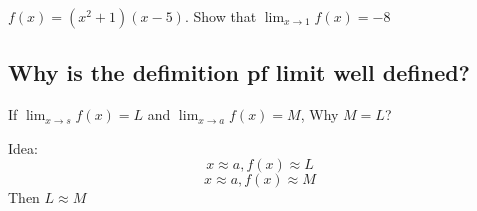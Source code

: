 \documentclass{report}
\begin{document}
     {
      $f(x) = (x^2+1)(x-5)$.  Show that $\lim_{x \to 1} f(x) = -8$
    }

    \subsection{Why is the defimition pf limit well defined?}%
    If $\lim_{x \to s} f(x) = L$ and $\lim_{x \to a} f(x) = M$, Why
    $M=L$?
      
    Idea:
      \[ x \approx a, f(x) \approx L \]
      \[ x \approx a, f(x) \approx M \]
      Then $L \approx M$
\end{document}
